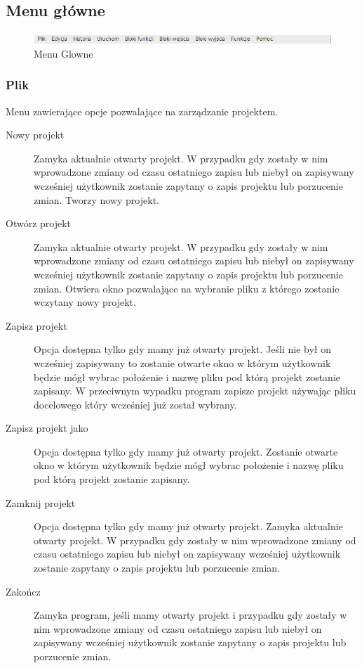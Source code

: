 \documentclass[a4paper,10pt]{article}
\begin{document}
\subsection{Menu główne}
\begin{figure}[h]
 \centering
 \includegraphics[scale=0.5]{menuglowne}
 \caption{Menu Glowne}
 \label{fig:Interface}
\end{figure}
\subsubsection{Plik}
Menu zawierające opcje pozwalające na zarządzanie projektem.
\begin{description}
\item[Nowy projekt] Zamyka aktualnie otwarty projekt. W przypadku gdy zostały w nim wprowadzone zmiany od czasu ostatniego zapisu lub niebył on zapisywany wcześniej użytkownik zostanie zapytany o zapis projektu lub porzucenie zmian. Tworzy nowy projekt.
\item[Otwórz projekt] Zamyka aktualnie otwarty projekt. W przypadku gdy zostały w nim wprowadzone zmiany od czasu ostatniego zapisu lub niebył on zapisywany wcześniej użytkownik zostanie zapytany o zapis projektu lub porzucenie zmian. Otwiera okno pozwalające na wybranie pliku z którego zostanie wczytany nowy projekt.
\item[Zapisz projekt] Opcja dostępna tylko gdy mamy już otwarty projekt. Jeśli nie był on wcześniej zapisywany to zostanie otwarte okno w którym użytkownik będzie mógł wybrac położenie i nazwę pliku pod którą projekt zostanie zapisany. W przeciwnym wypadku program zapisze projekt używając pliku docelowego który wcześniej już został wybrany.
\item[Zapisz projekt jako] Opcja dostępna tylko gdy mamy już otwarty projekt. Zostanie otwarte okno w którym użytkownik będzie mógł wybrac położenie i nazwę pliku pod którą projekt zostanie zapisany.
\item[Zamknij projekt] Opcja dostępna tylko gdy mamy już otwarty projekt. Zamyka aktualnie otwarty projekt. W przypadku gdy zostały w nim wprowadzone zmiany od czasu ostatniego zapisu lub niebył on zapisywany wcześniej użytkownik zostanie zapytany o zapis projektu lub porzucenie zmian.
\item[Zakończ] Zamyka program, jeśli mamy otwarty projekt i przypadku gdy zostały w nim wprowadzone zmiany od czasu ostatniego zapisu lub niebył on zapisywany wcześniej użytkownik zostanie zapytany o zapis projektu lub porzucenie zmian. 
\end{description}
\end{document}
